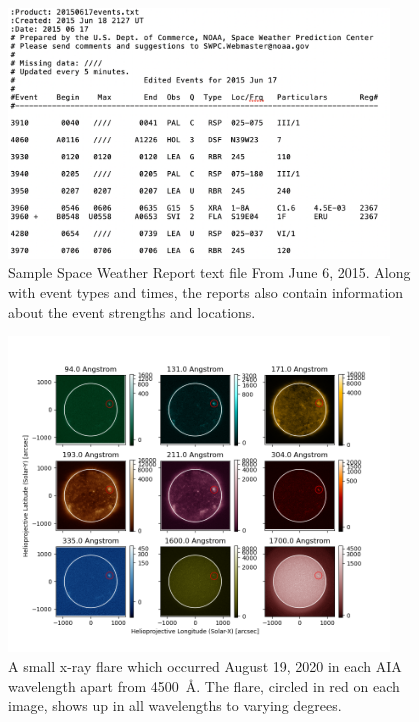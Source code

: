 \documentclass[12pt, letterpaper]{article}
\begin{document}
\begin{figure}[ht]
    \includegraphics[width=0.9\textwidth]{figures/swr_sample.png}
    \centering
    \caption{Sample Space Weather Report text file From June 6, 2015. Along with event types and times, the reports also contain information about the event strengths and locations.}
    \label{swr_sample}
\end{figure}

\begin{figure}[ht]
	\includegraphics[width=0.9\textwidth]{figures/0819_flare_labeled.png}
	\centering
	\caption{A small x-ray flare which occurred August 19, 2020 in each AIA wavelength apart from 4500~\AA{}. The flare, circled in red on each image, shows up in all wavelengths to varying degrees.}
	\label{flare}
\end{figure}
\end{document}
